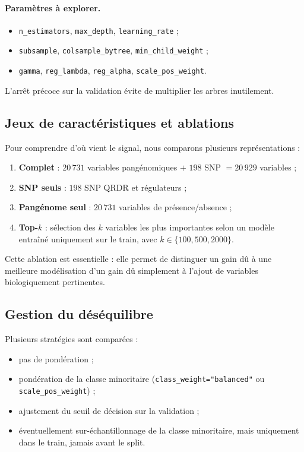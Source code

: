 \documentclass[11pt,a4paper]{article}
\begin{document}
\paragraph{Paramètres à explorer.}
\begin{itemize}[leftmargin=1.2em, nosep]
    \item \texttt{n\_estimators}, \texttt{max\_depth}, \texttt{learning\_rate} ;
    \item \texttt{subsample}, \texttt{colsample\_bytree}, \texttt{min\_child\_weight} ;
    \item \texttt{gamma}, \texttt{reg\_lambda}, \texttt{reg\_alpha}, \texttt{scale\_pos\_weight}.
\end{itemize}
L'arrêt précoce sur la validation évite de multiplier les arbres inutilement.

\subsection{Jeux de caractéristiques et ablations}

Pour comprendre d'où vient le signal, nous comparons plusieurs représentations :
\begin{enumerate}[leftmargin=1.4em]
    \item \textbf{Complet} : $20\,731$ variables pangénomiques $+$ $198$ SNP $= 20\,929$ variables ;
    \item \textbf{SNP seuls} : $198$ SNP QRDR et régulateurs ;
    \item \textbf{Pangénome seul} : $20\,731$ variables de présence/absence ;
    \item \textbf{Top-$k$} : sélection des $k$ variables les plus importantes selon un modèle entraîné uniquement sur le train, avec $k \in \{100, 500, 2000\}$.
\end{enumerate}

Cette ablation est essentielle : elle permet de distinguer un gain dû à une meilleure modélisation d'un gain dû simplement à l'ajout de variables biologiquement pertinentes.

\subsection{Gestion du déséquilibre}

Plusieurs stratégies sont comparées :
\begin{itemize}[leftmargin=1.2em]
    \item pas de pondération ;
    \item pondération de la classe minoritaire (\texttt{class\_weight="balanced"} ou \texttt{scale\_pos\_weight}) ;
    \item ajustement du seuil de décision sur la validation ;
    \item éventuellement sur-échantillonnage de la classe minoritaire, mais uniquement dans le train, jamais avant le split.
\end{itemize}
\end{document}
